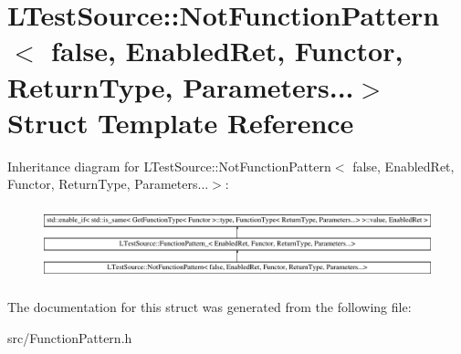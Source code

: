 \hypertarget{struct_l_test_source_1_1_not_function_pattern_3_01false_00_01_enabled_ret_00_01_functor_00_01_re29678e3c9b0b95a3828e89948c642b77}{\section{L\-Test\-Source\-:\-:Not\-Function\-Pattern$<$ false, Enabled\-Ret, Functor, Return\-Type, Parameters...$>$ Struct Template Reference}
\label{struct_l_test_source_1_1_not_function_pattern_3_01false_00_01_enabled_ret_00_01_functor_00_01_re29678e3c9b0b95a3828e89948c642b77}
}
Inheritance diagram for L\-Test\-Source\-:\-:Not\-Function\-Pattern$<$ false, Enabled\-Ret, Functor, Return\-Type, Parameters...$>$\-:\begin{figure}[H]
\begin{center}
\leavevmode
\includegraphics[height=2.187500cm]{struct_l_test_source_1_1_not_function_pattern_3_01false_00_01_enabled_ret_00_01_functor_00_01_re29678e3c9b0b95a3828e89948c642b77}
\end{center}
\end{figure}


The documentation for this struct was generated from the following file\-:\begin{DoxyCompactItemize}
\item 
src/Function\-Pattern.\-h\end{DoxyCompactItemize}

